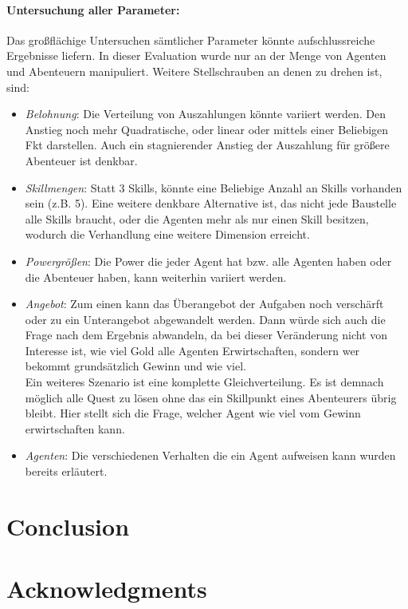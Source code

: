 \documentclass[fleqn,10pt]{SelfArx} %
\begin{document}
\paragraph{Untersuchung aller Parameter:}
Das großflächige Untersuchen sämtlicher Parameter könnte aufschlussreiche Ergebnisse liefern. In dieser Evaluation wurde nur an der Menge von Agenten und Abenteuern manipuliert. Weitere Stellschrauben an denen zu drehen ist, sind:
\begin{itemize}
	\item \textit{Belohnung}: Die Verteilung von Auszahlungen könnte variiert werden. Den Anstieg noch mehr Quadratische, oder linear oder mittels einer Beliebigen Fkt darstellen. Auch ein stagnierender Anstieg der Auszahlung für größere Abenteuer ist denkbar.
	\item \textit{Skillmengen}: Statt 3 Skills, könnte eine Beliebige Anzahl an Skills vorhanden sein (z.B. 5). Eine weitere denkbare Alternative ist, das nicht jede Baustelle alle Skills braucht, oder die Agenten mehr als nur einen Skill besitzen, wodurch die Verhandlung eine weitere Dimension erreicht. 
	\item \textit{Powergrößen}: Die Power die jeder Agent hat bzw. alle Agenten haben oder die Abenteuer haben, kann weiterhin variiert werden.
	\item \textit{Angebot}: Zum einen kann das Überangebot der Aufgaben noch verschärft oder zu ein Unterangebot abgewandelt werden. Dann würde sich auch die Frage nach dem Ergebnis abwandeln, da bei dieser Veränderung nicht von Interesse ist, wie viel Gold alle Agenten Erwirtschaften, sondern wer bekommt grundsätzlich Gewinn und wie viel. \\
	Ein weiteres Szenario ist eine komplette Gleichverteilung. Es ist demnach möglich alle Quest zu lösen ohne das ein Skillpunkt eines Abenteurers übrig bleibt. Hier stellt sich die Frage, welcher Agent wie viel vom Gewinn erwirtschaften kann.
	\item \textit{Agenten}: Die verschiedenen Verhalten die ein Agent aufweisen kann wurden bereits erläutert.
\end{itemize}




\section{Conclusion}
\label{sec:Conclusion}

\section*{Acknowledgments} %
\end{document}
